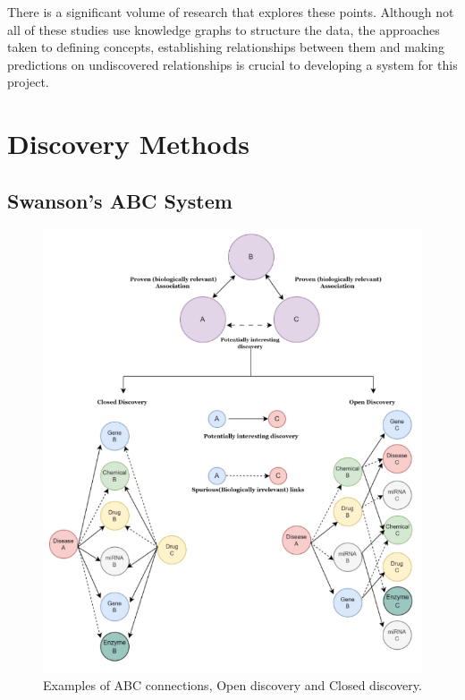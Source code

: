 \documentclass{l4proj}
\begin{document}
There is a significant volume of research that explores these points. Although not all of these studies use knowledge graphs to structure the data, the approaches taken to defining concepts, establishing relationships between them and making predictions on undiscovered relationships is crucial to developing a system for this project. \\

\section{Discovery Methods}

\subsection{Swanson's ABC System}

\begin{figure}
    \centering
    \includegraphics[width=\linewidth]{images/abc_open_closed.png}
    \caption{Examples of ABC connections, Open discovery and Closed discovery. \citep{bhasuran_literature_2023}}
    \label{fig:open_closed}
\end{figure}
\end{document}
